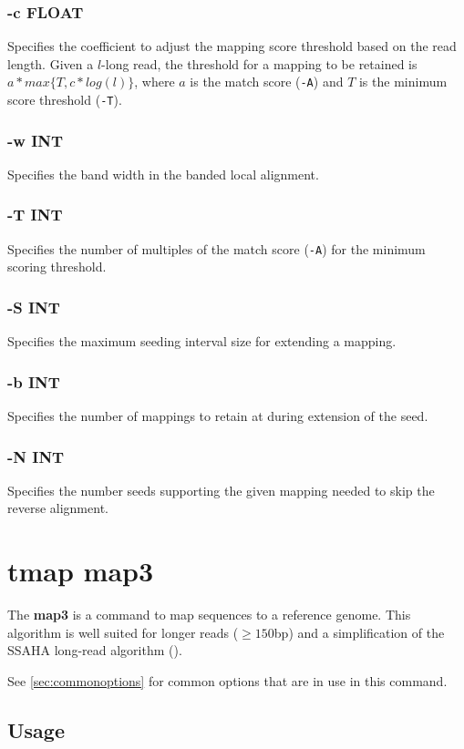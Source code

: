 \documentclass[a4paper,12pt]{book}
\newcommand{\TT}[1]{{\tt #1}} %
\newcommand{\BF}[1]{{\bf #1}} %
\begin{document}
\subsubsection{-c FLOAT}
Specifies the coefficient to adjust the mapping score threshold based on the read length.
Given a $l$-long read, the threshold for a mapping to be retained is $a*max\{T,c*log(l)\}$, where $a$ is the match score (\TT{-A}) and $T$ is the minimum score threshold (\TT{-T}).

\subsubsection{-w INT}
Specifies the band width in the banded local alignment.

\subsubsection{-T INT}
Specifies the number of multiples of the match score (\TT{-A}) for the minimum scoring threshold.

\subsubsection{-S INT}
Specifies the maximum seeding interval size for extending a mapping.

\subsubsection{-b INT}
Specifies the number of mappings to retain at during extension of the seed.

\subsubsection{-N INT}
Specifies the number seeds supporting the given mapping needed to skip the reverse alignment.

\section{tmap map3}
\label{sec:map3}
The \BF{map3} is a command to map sequences to a reference genome.
This algorithm is well suited for longer reads ($\geq 150$bp) and a simplification of the SSAHA long-read algorithm (\cite{SSAHA}).

See \autoref{sec:commonoptions} for common options that are in use in this command.

\subsection{Usage}
\end{document}
